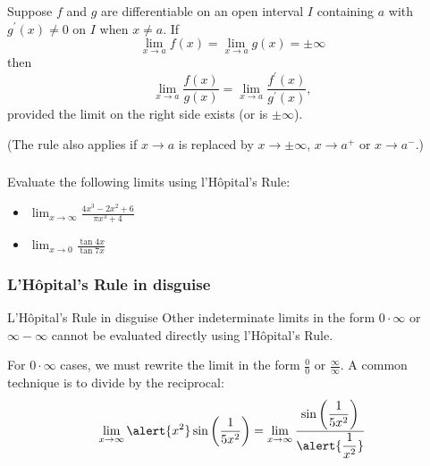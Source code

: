 \documentclass[cal1spr16Lectures.tex]{subfiles}
\begin{document}
\begin{frame}
\frametitle{}
\small
\begin{thm}
Suppose $f$ and $g$ are differentiable on an open interval $I$ containing $a$ with $g^{\prime}(x) \ne 0$ on $I$ when $x \ne a$.  If 
$$\lim_{x \to a} f(x)=\lim_{x \to a} g(x)=\pm\infty$$
then
$$\lim_{x \to a} \frac{f(x)}{g(x)}=\lim_{x \to a} \frac{f^{\prime}(x)}{g^{\prime}(x)},$$
provided the limit on the right side exists (or is $\pm \infty$).
\end{thm}

\vspace{1pc}
(The rule also applies if $x \to a$ is replaced by $x \to \pm \infty$, $x \to a^+$ or $x \to a^-$.)
\end{frame}

\begin{frame}%
\frametitle{}
\begin{exe} Evaluate the following limits using l'H\^{o}pital's Rule:

\begin{itemize}
\item $\displaystyle\lim_{x \to \infty} \frac{4x^3-2x^2+6}{\pi x^3+4}$

\vspace{1pc}
\item $\displaystyle\lim_{x \to 0} \frac{\tan 4x}{\tan 7x}$
\end{itemize}
\end{exe}
\end{frame}

\subsubsection{L'H\^opital's Rule in disguise}

\begin{frame}{\small L'H\^opital's Rule in disguise}
\small
Other indeterminate limits in the form $0 \cdot \infty$ or $\infty - \infty$ cannot be evaluated directly using l'H\^{o}pital's Rule.

\vspace{1pc}
For $0 \cdot \infty$ cases, we must rewrite the limit in the form $\frac{0}{0}$ or $\frac{\infty}{\infty}$.  A common technique is to divide by the reciprocal:
\[\lim_{x \to \infty} \alert{x^2} \sin \left( \frac{1}{5x^2} \right) = \lim_{x \to \infty} \frac{\sin \left( \dfrac{1}{5x^2} \right)}{\alert{\dfrac{1}{x^2}}}\]
\end{frame}
\end{document}
